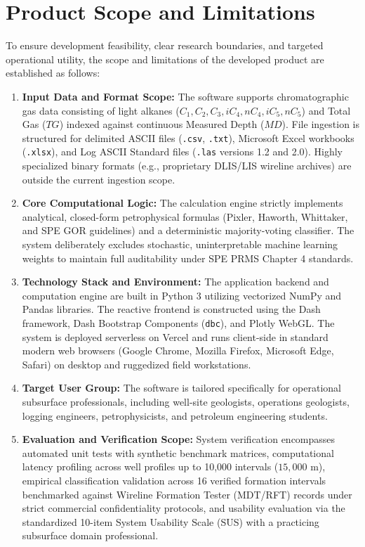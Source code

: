 \section{Product Scope and Limitations}

To ensure development feasibility, clear research boundaries, and targeted operational utility, the scope and limitations of the developed product are established as follows:

\begin{enumerate}
    \item \textbf{Input Data and Format Scope:} The software supports chromatographic gas data consisting of light alkanes ($C_1, C_2, C_3, iC_4, nC_4, iC_5, nC_5$) and Total Gas ($TG$) indexed against continuous Measured Depth ($MD$). File ingestion is structured for delimited ASCII files (\texttt{.csv}, \texttt{.txt}), Microsoft Excel workbooks (\texttt{.xlsx}), and Log ASCII Standard files (\texttt{.las} versions 1.2 and 2.0). Highly specialized binary formats (e.g., proprietary DLIS/LIS wireline archives) are outside the current ingestion scope.
    
    \item \textbf{Core Computational Logic:} The calculation engine strictly implements analytical, closed-form petrophysical formulas (Pixler, Haworth, Whittaker, and SPE GOR guidelines) and a deterministic majority-voting classifier. The system deliberately excludes stochastic, uninterpretable machine learning weights to maintain full auditability under SPE PRMS Chapter 4 standards.
    
    \item \textbf{Technology Stack and Environment:} The application backend and computation engine are built in Python 3 utilizing vectorized NumPy and Pandas libraries. The reactive frontend is constructed using the Dash framework, Dash Bootstrap Components (\texttt{dbc}), and Plotly WebGL. The system is deployed serverless on Vercel and runs client-side in standard modern web browsers (Google Chrome, Mozilla Firefox, Microsoft Edge, Safari) on desktop and ruggedized field workstations.
    
    \item \textbf{Target User Group:} The software is tailored specifically for operational subsurface professionals, including well-site geologists, operations geologists, logging engineers, petrophysicists, and petroleum engineering students.
    
    \item \textbf{Evaluation and Verification Scope:} System verification encompasses automated unit tests with synthetic benchmark matrices, computational latency profiling across well profiles up to 10,000 intervals ($15,000\text{ m}$), empirical classification validation across 16 verified formation intervals benchmarked against Wireline Formation Tester (MDT/RFT) records under strict commercial confidentiality protocols, and usability evaluation via the standardized 10-item System Usability Scale (SUS) with a practicing subsurface domain professional.
\end{enumerate}

